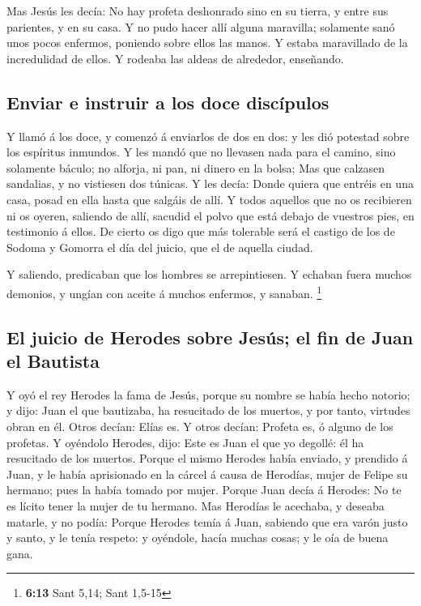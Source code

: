  Mas Jesús les decía: No hay profeta deshonrado sino en su
tierra, y entre sus parientes, y en su casa.  Y no pudo
hacer allí alguna maravilla; solamente sanó unos pocos enfermos,
poniendo sobre ellos las manos.  Y estaba maravillado de la
incredulidad de ellos. Y rodeaba las aldeas de alrededor, enseñando.

\hypertarget{enviar-e-instruir-a-los-doce-discuxedpulos}{%
\subsection{Enviar e instruir a los doce
discípulos}\label{enviar-e-instruir-a-los-doce-discuxedpulos}}

 Y llamó á los doce, y comenzó á enviarlos de dos en dos: y
les dió potestad sobre los espíritus inmundos.  Y les mandó
que no llevasen nada para el camino, sino solamente báculo; no alforja,
ni pan, ni dinero en la bolsa;  Mas que calzasen sandalias,
y no vistiesen dos túnicas.  Y les decía: Donde quiera que
entréis en una casa, posad en ella hasta que salgáis de allí.
 Y todos aquellos que no os recibieren ni os oyeren,
saliendo de allí, sacudid el polvo que está debajo de vuestros pies, en
testimonio á ellos. De cierto os digo que más tolerable será el castigo
de los de Sodoma y Gomorra el día del juicio, que el de aquella ciudad.

 Y saliendo, predicaban que los hombres se arrepintiesen.
 Y echaban fuera muchos demonios, y ungían con aceite á
muchos enfermos, y sanaban. \footnote{\textbf{6:13} Sant 5,14; Sant
  1,5-15}

\hypertarget{el-juicio-de-herodes-sobre-jesuxfas-el-fin-de-juan-el-bautista}{%
\subsection{El juicio de Herodes sobre Jesús; el fin de Juan el
Bautista}\label{el-juicio-de-herodes-sobre-jesuxfas-el-fin-de-juan-el-bautista}}

 Y oyó el rey Herodes la fama de Jesús, porque su nombre se
había hecho notorio; y dijo: Juan el que bautizaba, ha resucitado de los
muertos, y por tanto, virtudes obran en él.  Otros decían:
Elías es. Y otros decían: Profeta es, ó alguno de los profetas.
 Y oyéndolo Herodes, dijo: Este es Juan el que yo degollé:
él ha resucitado de los muertos.  Porque el mismo Herodes
había enviado, y prendido á Juan, y le había aprisionado en la cárcel á
causa de Herodías, mujer de Felipe su hermano; pues la había tomado por
mujer.  Porque Juan decía á Herodes: No te es lícito tener
la mujer de tu hermano.  Mas Herodías le acechaba, y
deseaba matarle, y no podía:  Porque Herodes temía á Juan,
sabiendo que era varón justo y santo, y le tenía respeto: y oyéndole,
hacía muchas cosas; y le oía de buena gana.

